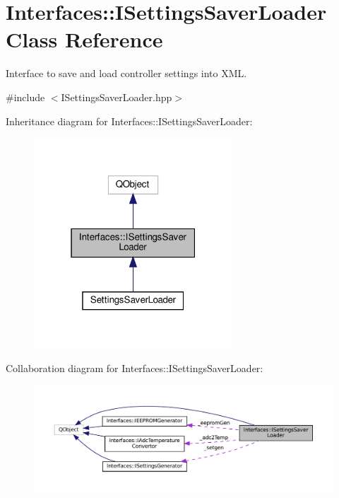 \hypertarget{class_interfaces_1_1_i_settings_saver_loader}{}\section{Interfaces\+:\+:I\+Settings\+Saver\+Loader Class Reference}
\label{class_interfaces_1_1_i_settings_saver_loader}


Interface to save and load controller settings into X\+ML.  




{\ttfamily \#include $<$I\+Settings\+Saver\+Loader.\+hpp$>$}



Inheritance diagram for Interfaces\+:\+:I\+Settings\+Saver\+Loader\+:\nopagebreak
\begin{figure}[H]
\begin{center}
\leavevmode
\includegraphics[width=211pt]{class_interfaces_1_1_i_settings_saver_loader__inherit__graph}
\end{center}
\end{figure}


Collaboration diagram for Interfaces\+:\+:I\+Settings\+Saver\+Loader\+:\nopagebreak
\begin{figure}[H]
\begin{center}
\leavevmode
\includegraphics[width=350pt]{class_interfaces_1_1_i_settings_saver_loader__coll__graph}
\end{center}
\end{figure}
